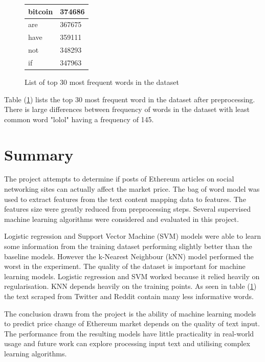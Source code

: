 \documentclass[transmag]{IEEEtran}
\begin{document}
\begin{figure}[h]
\begin{center}
\begin{tabular}{|l|l|}
bitcoin                             & 374686                                  \\ \hline
are                                 & 367675                                  \\ \hline
have                                & 359111                                  \\ \hline
not                                 & 348293                                  \\ \hline
if                                  & 347963                                  \\ \hline
\end{tabular}
\end{center}
\caption{List of top 30 most frequent words in the dataset}
    \label{tab:top30words}
\end{figure}

\noindent Table (\ref{tab:top30words}) lists the top 30 most frequent word in the dataset after preprocessing. There is large differences between frequency of words in the dataset with least common word "lolol" having a frequency of 145.




\section{Summary}

\noindent The project attempts to determine if posts of Ethereum articles on social networking sites can actually affect the market price. The bag of word model was used to extract features from the text content mapping data to features. The features size were greatly reduced from preprocessing steps. Several supervised machine learning algorithms were considered and evaluated in this project.

\noindent Logistic regression and Support Vector Machine (SVM) models were able to learn some information from the training dataset performing slightly better than the baseline models. However the k-Nearest Neighbour (kNN) model performed the worst in the experiment. The quality of the dataset is important for machine learning models. Logistic regression and SVM worked because it relied heavily on regularisation. KNN depends heavily on the training points. As seen in table (\ref{tab:top30words}) the text scraped from Twitter and Reddit contain many less informative words.

\noindent The conclusion drawn from the project is the ability of machine learning models to predict price change of Ethereum market depends on the quality of text input. The performance from the resulting models have little practicality in real-world usage and future work can explore processing input text and utilising complex learning algorithms.







\end{document}
